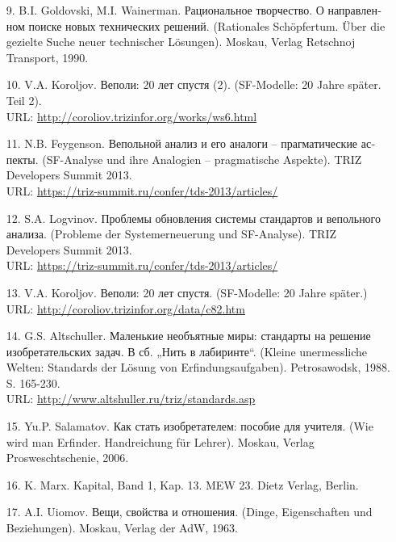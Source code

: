 \documentclass[11pt,a4paper]{article}
\begin{document}
\begin{itemize}
{  современный вещественно-полевой анализ}. (TRIZ-Instrumente für das
  21. Jahrhundert: Moderne SF-Analyse). 2008.\\ URL:
  \url{https://refdb.ru/look/2055665.html}
\item[9.] B.I. Goldovski, M.I. Wainerman.
  \foreignlanguage{russian}{Рациональное творчество. О направленном поиске
    новых технических решений.} (Rationales Schöpfertum. Über die gezielte
  Suche neuer technischer Lösungen). Moskau, Verlag Retschnoj Transport, 1990.
\item[10.] V.A. Koroljov.  \foreignlanguage{russian}{Веполи: 20 лет спустя
  (2)}.  (SF-Modelle: 20 Jahre später. Teil 2). \\ URL:
  \url{http://coroliov.trizinfor.org/works/ws6.html}
\item[11.] N.B. Feygenson.  \foreignlanguage{russian}{Вепольной анализ и его
  аналоги – прагматические аспекты}. (SF-Analyse und ihre Analogien --
  pragmatische Aspekte).  TRIZ Developers Summit 2013.\\  URL:
  \url{https://triz-summit.ru/confer/tds-2013/articles/}
\item[12.] S.A. Logvinov. \foreignlanguage{russian}{Проблемы обновления
  системы стандартов и вепольного анализа}. (Probleme der Systemerneuerung und
  SF-Analyse). TRIZ Developers Summit 2013. \\ URL:
  \url{https://triz-summit.ru/confer/tds-2013/articles/}
\item[13.] V.A. Koroljov. \foreignlanguage{russian}{Веполи: 20 лет спустя}.
  (SF-Modelle: 20 Jahre später.)\\ URL:
  \url{http://coroliov.trizinfor.org/data/c82.htm}
\item[14.] G.S. Altschuller. \foreignlanguage{russian}{Маленькие необъятные
  миры: стандарты на решение изобретательских задач. В сб. „Нить в
  лабиринте“.} (Kleine unermessliche Welten: Standards der Lösung von
  Erfindungsaufgaben). Petrosawodsk, 1988. S. 165-230.\\ URL:
  \url{http://www.altshuller.ru/triz/standards.asp}
\item[15.] Yu.P. Salamatov. \foreignlanguage{russian}{Как стать изобретателем:
  пособие для учителя.} (Wie wird man Erfinder. Handreichung für Lehrer).
  Moskau, Verlag Prosweschtschenie, 2006.
\item[16.] K. Marx. Kapital, Band 1, Kap. 13. MEW 23. Dietz Verlag, Berlin.
\item[17.] A.I. Uiomov. \foreignlanguage{russian}{Вещи, свойства и отношения.}
  (Dinge, Eigenschaften und Beziehungen). Moskau, Verlag der AdW, 1963.
\end{itemize}
\end{document}
